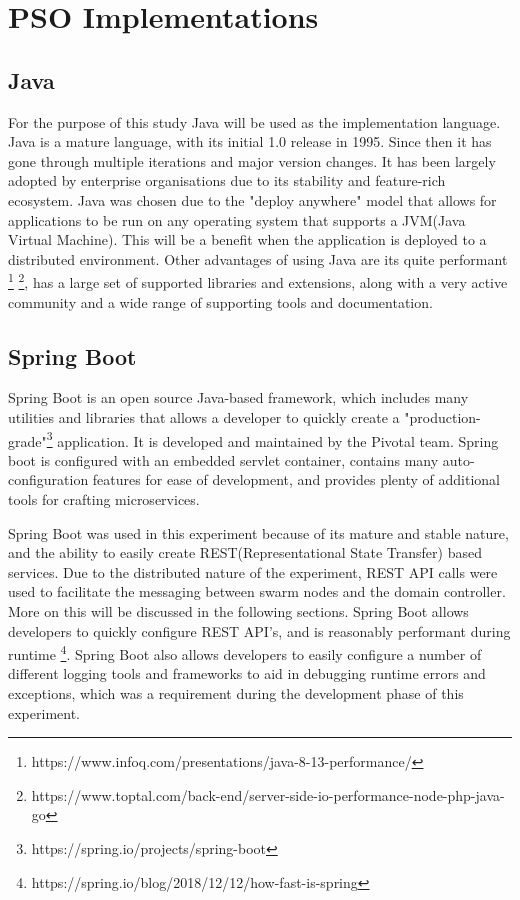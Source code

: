 \documentclass[oneside,12pt]{book}
\begin{document}
\section{PSO Implementations}

\subsection{Java}
For the purpose of this study Java will be used as the implementation language. Java is a mature language, with its initial 1.0 release in 1995. Since then it has gone through multiple iterations and major version changes. It has been largely adopted by enterprise organisations due to its stability and feature-rich ecosystem. Java was chosen due to the "deploy anywhere" model that allows for applications to be run on any operating system that supports a JVM(Java Virtual Machine). This will be a benefit when the application is deployed to a distributed environment. Other advantages of using Java are its quite performant \footnote{https://www.infoq.com/presentations/java-8-13-performance/} \footnote{https://www.toptal.com/back-end/server-side-io-performance-node-php-java-go}, has a large set of supported libraries and extensions, along with a very active community and a wide range of supporting tools and documentation.

\subsection{Spring Boot}
Spring Boot is an open source Java-based framework, which includes many utilities and libraries that allows a developer to quickly create a "production-grade"\footnote{https://spring.io/projects/spring-boot} application. It is developed and maintained by the Pivotal team. Spring boot is configured with an embedded servlet container, contains many auto-configuration features for ease of development, and provides plenty of additional tools for crafting microservices. 

Spring Boot was used in this experiment because of its mature and stable nature, and the ability to easily create REST(Representational State Transfer) based services. Due to the distributed nature of the experiment, REST API calls were used to facilitate the messaging between swarm nodes and the domain controller. More on this will be discussed in the following sections. Spring Boot allows developers to quickly configure REST API's, and is reasonably performant during runtime \footnote{https://spring.io/blog/2018/12/12/how-fast-is-spring}. Spring Boot also allows developers to easily configure a number of different logging tools and frameworks to aid in debugging runtime errors and exceptions, which was a requirement during the development phase of this experiment. 
\end{document}
